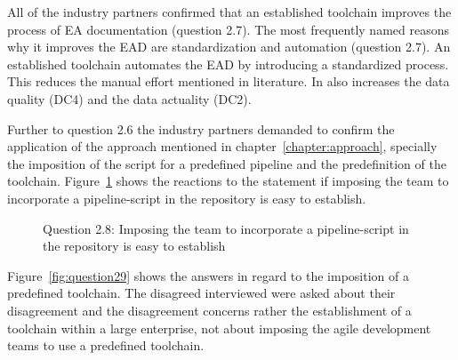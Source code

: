 All of the industry partners confirmed that an established toolchain improves the process of EA documentation (question 2.7). The most frequently named reasons why it improves the EAD are standardization and automation (question 2.7). An established toolchain automates the EAD by introducing a standardized process. This reduces the manual effort mentioned in literature. \cite{Hauder2012} In also increases the data quality (DC4) and the data actuality (DC2). 

Further to question 2.6 the industry partners demanded to confirm the application of the approach mentioned in chapter~\ref{chapter:approach}, specially the imposition of the script for a predefined pipeline and the predefinition of the toolchain. Figure~\ref{fig:question28} shows the reactions to the statement if imposing the team to incorporate a pipeline-script in the repository is easy to establish.

\begin{figure}[htpb]
\centering
{}
\caption{Question 2.8: Imposing the team to incorporate a pipeline-script in the repository is easy to establish}
\label{fig:question28}
\end{figure}


Figure~\ref{fig:question29} shows the answers in regard to the imposition of a predefined toolchain. The disagreed interviewed were asked about their disagreement and the disagreement concerns rather the establishment of a toolchain within a large enterprise, not about imposing the agile development teams to use a predefined toolchain.

